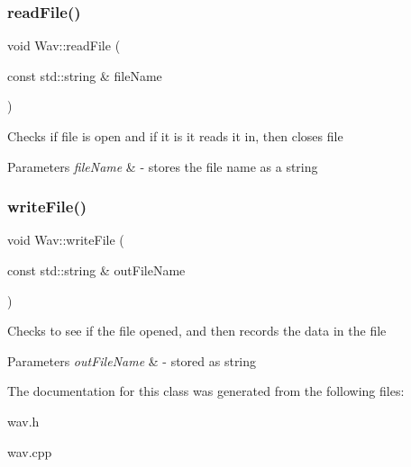 \subsubsection{\texorpdfstring{read\+File()}{readFile()}}
{\footnotesize\ttfamily void Wav\+::read\+File (\begin{DoxyParamCaption}\item[{const std\+::string \&}]{file\+Name }\end{DoxyParamCaption})}

Checks if file is open and if it is it reads it in, then closes file 
\begin{DoxyParams}{Parameters}
{\em file\+Name} & -\/ stores the file name as a string \\
\hline
\end{DoxyParams}
\mbox{\label{classWav_ad86f4a21d36719ae375ea2586f9f591f}} 
\subsubsection{\texorpdfstring{write\+File()}{writeFile()}}
{\footnotesize\ttfamily void Wav\+::write\+File (\begin{DoxyParamCaption}\item[{const std\+::string \&}]{out\+File\+Name }\end{DoxyParamCaption})}

Checks to see if the file opened, and then records the data in the file 
\begin{DoxyParams}{Parameters}
{\em out\+File\+Name} & -\/ stored as string \\
\hline
\end{DoxyParams}


The documentation for this class was generated from the following files\+:\begin{DoxyCompactItemize}
\item 
wav.\+h\item 
wav.\+cpp\end{DoxyCompactItemize}
